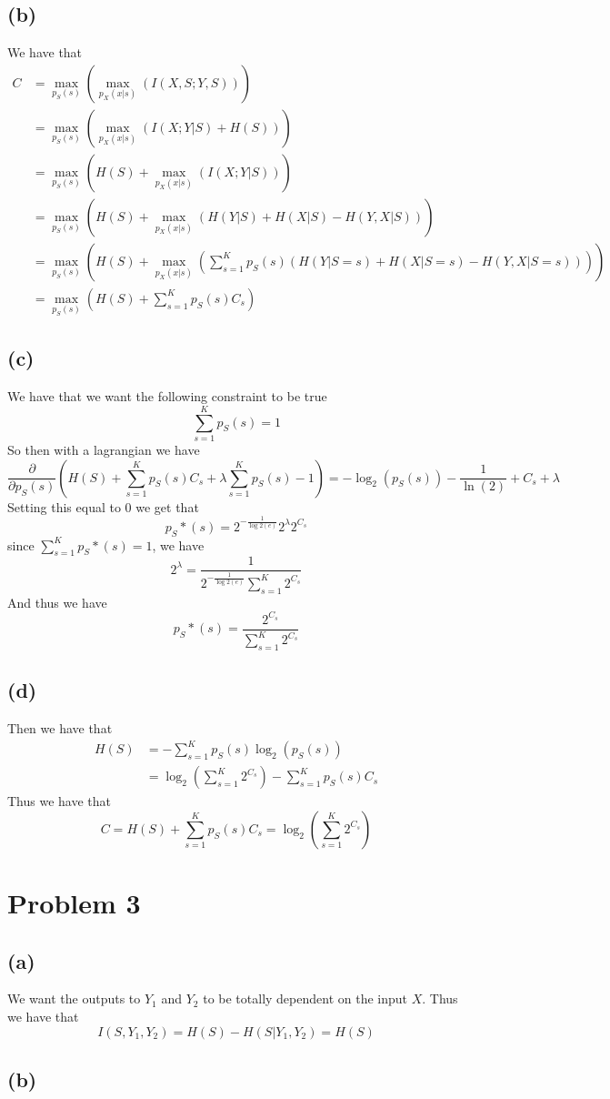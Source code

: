 \subsection*{(b)}
We have that 
\begin{align*}
    C&=\max_{p_S(s)}\left(\max_{p_X(x|s)}\left(I(X,S;Y,S)\right)\right)\\
    &=\max_{p_S(s)}\left(\max_{p_X(x|s)}\left(I(X;Y|S)+H(S)\right)\right)\\
    &=\max_{p_S(s)}\left(H(S)+\max_{p_X(x|s)}\left(I(X;Y|S)\right)\right)\\
    &=\max_{p_S(s)}\left(H(S)+\max_{p_X(x|s)}\left(H(Y|S)+H(X|S)-H(Y,X|S)\right)\right)\\
    &=\max_{p_S(s)}\left(H(S)+\max_{p_X(x|s)}\left(\sum_{s=1}^{K}p_S(s)(H(Y|S=s)+H(X|S=s)-H(Y,X|S=s))\right)\right)\\
    &=\max_{p_S(s)}\left(H(S)+\sum_{s=1}^{K}p_S(s)C_s\right)
\end{align*}
\subsection*{(c)}
We have that we want the following constraint to be true
$$\sum_{s=1}^{K}p_S(s)=1$$
So then with a lagrangian we have
$$\frac{\partial}{\partial p_S(s)}\left(H(S)+\sum_{s=1}^{K}p_S(s)C_s+\lambda\sum_{s=1}^{K}p_S(s)-1\right)=-\log_2(p_S(s))-\frac{1}{\ln(2)}+C_s+\lambda$$
Setting this equal to 0 we get that 
$$p_S*(s)=2^{-\frac{1}{\log2(e)}}2^{\lambda}2^{C_s}$$
since $\sum_{s=1}^{K}p_S*(s)=1$, we have
$$2^{\lambda}=\frac{1}{2^{-\frac{1}{\log2(e)}}\sum_{s=1}^{K}2^{C_s}}$$
And thus we have 
$$p_S*(s)=\boxed{\frac{2^{C_s}}{\sum_{s=1}^{K}2^{C_s}}}$$
\subsection*{(d)}
Then we have that 
\begin{align*}
    H(S)&=-\sum_{s=1}^{K}p_S(s)\log_2(p_S(s))\\
    &=\log_2\left(\sum_{s=1}^{K}2^{C_s}\right)-\sum_{s=1}^{K}p_S(s) C_s
\end{align*}
Thus we have that
$$C=H(S)+\sum_{s=1}^{K}p_S(s) C_s=\log_2\left(\sum_{s=1}^{K}2^{C_s}\right)$$
\section*{Problem 3}
\subsection*{(a)}
We want the outputs to $Y_1$ and $Y_2$ to be totally
dependent on the input $X$. Thus we have that 
$$I(S,Y_1,Y_2)=H(S)-H(S|Y_1,Y_2)=H(S)$$
\subsection*{(b)}

